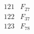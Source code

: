 \documentclass{article}
\begin{document}
{$$\begin{array}{|r|*{7}{r|}}
 & 
 & 
\\
\hline
121 
 & F_{27} &
 & 
 & 
 & 
 & 
 & 
\\
\hline
122 
 & F_{37} &
 & 
 & 
 & 
 & 
 & 
\\
\hline
123 
 & F_{78} &
 & 

\end{array}$$}
\end{document}
